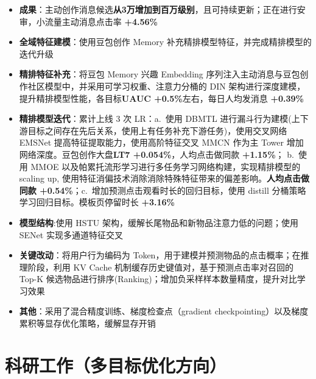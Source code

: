 \documentclass{resume}
\begin{document}
\begin{itemize}
        \item \textbf{成果}：主动创作消息候选\textbf{从3万增加到百万级别}，且可持续更新；正在进行安审，小流量主动消息点击率 \textbf{+4.56\%}
    \item[3.] \textbf{全域特征建模}：使用豆包创作 Memory 补充精排模型特征，并完成精排模型的迭代升级
        \item \textbf{精排特征补充}：将豆包 Memory 兴趣 Embedding 序列注入主动消息与豆包创作社区模型中，并采用可学习权重、注意力分桶的 DIN 架构进行深度建模，提升精排模型性能，各目标\textbf{UAUC +0.5\%}左右，每日人均发消息 \textbf{+0.39\%}
        \item \textbf{精排模型迭代}：累计上线 3 次 LR：a.~使用 DBMTL 进行漏斗行为建模(上下游目标之间存在先后关系，使用上有任务补充下游任务)，使用交叉网络 EMSNet 提高特征提取能力，使用高阶特征交叉 MMCN 作为主 Tower 增加网络深度。豆包创作大盘\textbf{LT7 +0.054\%}，人均点击做同款 \textbf{+1.15\%}；
        b.~使用 MMOE 以及帕累托流形学习进行多任务学习网络构建，实现精排模型的 scaling up, 使用特征消偏技术消除消除特殊特征带来的偏差影响。\textbf{人均点击做同款 +0.54\%}；c.~增加预测点击观看时长的回归目标，使用 distill 分桶策略学习回归目标。模板页停留时长 \textbf{+3.16\%}
\end{itemize}
\begin{itemize}
    \item \textbf{模型结构}:使用 HSTU 架构，缓解长尾物品和新物品注意力低的问题；使用 SENet 实现多通道特征交叉
    \item \textbf{关键改动}：将用户行为编码为 Token，用于建模并预测物品的点击概率；在推理阶段，利用 KV Cache 机制缓存历史键值对，基于预测点击率对召回的 Top-K 候选物品进行排序(Ranking)；增加负采样样本数量精度，提升对比学习效果
    \item \textbf{其他}：采用了混合精度训练、梯度检查点（gradient checkpointing）以及梯度累积等显存优化策略，缓解显存开销
\end{itemize}
\section{科研工作（多目标优化方向）}
\end{document}
